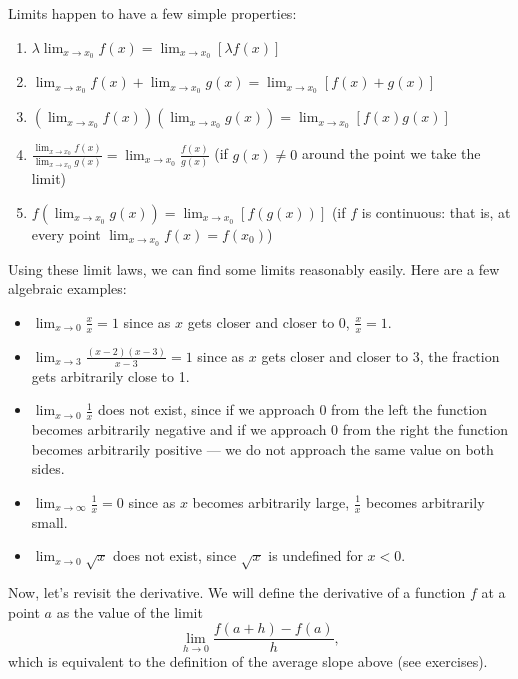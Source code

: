 Limits happen to have a few simple properties:
\begin{enumerate}
  \item $ \displaystyle \lambda \lim_{x \to x_0} f(x) = \lim_{x \to x_0} [\lambda f(x)] $
  \item $ \displaystyle \lim_{x \to x_0} f(x) + \lim_{x \to x_0} g(x) = \lim_{x \to x_0} [f(x) + g(x)] $
  \item $ \displaystyle (\lim_{x \to x_0} f(x))(\lim_{x \to x_0} g(x)) = \lim_{x \to x_0} [f(x)g(x)] $
  \item $ \displaystyle \frac{\lim_{x \to x_0} f(x)}{\lim_{x \to x_0} g(x)} = \lim_{x \to x_0} \frac{f(x)}{g(x)} $ (if $ g(x) \neq 0 $ around
        the point we take the limit)
  \item $ \displaystyle f(\lim_{x \to x_0} g(x)) = \lim_{x \to x_0} [f(g(x))] $ (if $ f $ is continuous: that is, at every
        point $ \lim_{x \to x_0} f(x) = f(x_0) $)
\end{enumerate}

Using these limit laws, we can find some limits reasonably easily. Here are a few algebraic examples:
\begin{itemize}
  \item $ \lim_{x \to 0} \frac{x}{x} = 1 $ since as $ x $ gets closer and closer to $ 0 $, $ \frac{x}{x} = 1 $.
  \item $ \lim_{x \to 3} \frac{(x - 2)(x - 3)}{x - 3} = 1 $ since as $ x $ gets closer and closer to 3, the fraction gets arbitrarily close to 1.
  \item $ \lim_{x \to 0} \frac{1}{x} $ does not exist, since if we approach 0 from the left the function becomes arbitrarily negative
        and if we approach 0 from the right the function becomes arbitrarily positive --- we do not approach the same value on both sides.
  \item $ \lim_{x \to \infty} \frac{1}{x} = 0 $ since as $ x $ becomes arbitrarily large, $ \frac{1}{x} $ becomes arbitrarily small.
  \item $ \lim_{x \to 0} \sqrt{x} $ does not exist, since $ \sqrt{x} $ is undefined for $ x < 0 $.
\end{itemize}

Now, let's revisit the derivative. We will define the derivative of a function $ f $ at a point $ a $ as the value of the limit
\begin{displaymath}
  \lim_{h \to 0} \frac{f(a + h) - f(a)}{h},
\end{displaymath}
which is equivalent to the definition of the average slope above (see exercises).


